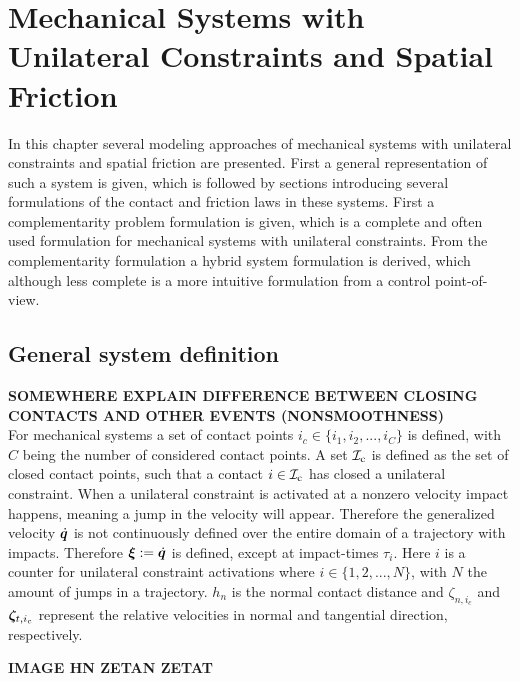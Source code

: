 \documentclass[../DC2017114Bouma.tex]{subfiles}
\begin{document}
\graphicspath{{02_Material/img/}}
\pagestyle{fancyreport}
\cleartooddpage
\pagestyle{fancyreport}
\chapter{Mechanical Systems with Unilateral Constraints and Spatial Friction}
In this chapter several modeling approaches of mechanical systems with unilateral constraints and spatial friction are presented. First a general representation of such a system is given, which is followed by sections introducing several formulations of the contact and friction laws in these systems. First a complementarity problem formulation is given, which is a complete and often used formulation for mechanical systems with unilateral constraints. From the complementarity formulation a hybrid system formulation is derived, which although less complete is a more intuitive formulation from a control point-of-view.
\section{General system definition}
\textbf{SOMEWHERE EXPLAIN DIFFERENCE BETWEEN CLOSING CONTACTS AND OTHER EVENTS (NONSMOOTHNESS)}\\
For mechanical systems a set of contact points $i_c\in\{i_1,i_2,...,i_C\}$ is defined, with $C$ being the number of considered contact points. A set $\mathcal{I}_\text{c}$ is defined as the set of closed contact points, such that a contact $i\in\mathcal{I}_\text{c}$ has closed a unilateral constraint. When a unilateral constraint is activated at a nonzero velocity impact happens, meaning a jump in the velocity will appear. Therefore the generalized velocity $\dot{{\boldsymbol{q}}}$ is not continuously defined over the entire domain of a trajectory with impacts. Therefore $\boldsymbol{\xi}:=\dot{{\boldsymbol{q}}}$ is defined, except at impact-times $\tau_i$. Here $i$ is a counter for unilateral constraint activations where $i\in \{1,2,...,N\}$, with $N$ the amount of jumps in a trajectory. $h_n$ is the normal contact distance and $\zeta_{n,i_c}$ and $\boldsymbol{\zeta}_{t,i_c}$ represent the relative velocities in normal and tangential direction,  respectively. 

\textbf{IMAGE HN ZETAN ZETAT}
\end{document}
